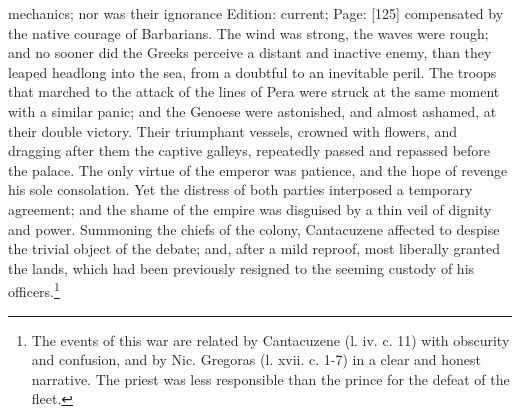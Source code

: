 mechanics; nor was their ignorance Edition: current; Page: [125] compensated by the native courage of Barbarians. The wind was strong, the waves were rough; and no sooner did the Greeks perceive a distant and inactive enemy, than they leaped headlong into the sea, from a doubtful to an inevitable peril. The troops that marched to the attack of the lines of Pera were struck at the same moment with a similar panic; and the Genoese were astonished, and almost ashamed, at their double victory. Their triumphant vessels, crowned with flowers, and dragging after them the captive galleys, repeatedly passed and repassed before the palace. The only virtue of the emperor was patience, and the hope of revenge his sole consolation. Yet the distress of both parties interposed a temporary agreement; and the shame of the empire was disguised by a thin veil of dignity and power. Summoning the chiefs of the colony, Cantacuzene affected to despise the trivial object of the debate; and, after a mild reproof, most liberally granted the lands, which had been previously resigned to the seeming custody of his officers.\footnote{The events of this war are related by Cantacuzene (l. iv. c. 11) with obscurity and confusion, and by Nic. Gregoras (l. xvii. c. 1-7) in a clear and honest narrative. The priest was less responsible than the prince for the defeat of the fleet.}


